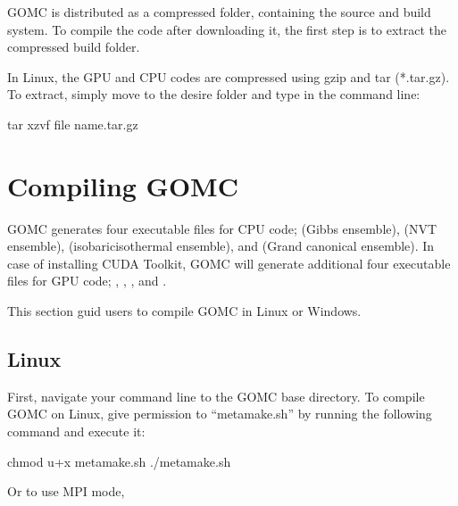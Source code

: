 \documentclass[letterpaper,10pt,english]{sphinxmanual}
\begin{document}
\noindent{}

GOMC is distributed as a compressed folder, containing the source and build system. To compile the code after downloading it, the first step is to extract the compressed build folder.

In Linux, the GPU and CPU codes are compressed using gzip and tar (*.tar.gz). To extract, simply move to the desire folder and type in the command line:

\begin{sphinxVerbatim}[commandchars=\\\{\}]
\PYGZdl{} tar \PYGZhy{}xzvf \PYGZlt{}file name\PYGZgt{}.tar.gz
\end{sphinxVerbatim}


\chapter{Compiling GOMC}
\label{\detokenize{compiling:compiling-gomc}}\label{\detokenize{compiling::doc}}
GOMC generates four executable files for CPU code;  (Gibbs ensemble),  (NVT ensemble),  (isobaric\sphinxhyphen{}isothermal ensemble), and  (Grand canonical ensemble). In case of installing CUDA Toolkit, GOMC will generate additional four executable files for GPU code; , , , and .

This section guid users to compile GOMC in Linux or Windows.


\section{Linux}
\label{\detokenize{compiling:linux}}
First, navigate your command line to the GOMC base directory. To compile GOMC on Linux, give permission to “metamake.sh” by running the following command and execute it:

\begin{sphinxVerbatim}[commandchars=\\\{\}]
\PYGZdl{} chmod u+x metamake.sh
\PYGZdl{} ./metamake.sh
\end{sphinxVerbatim}

Or to use MPI mode,
\end{document}
